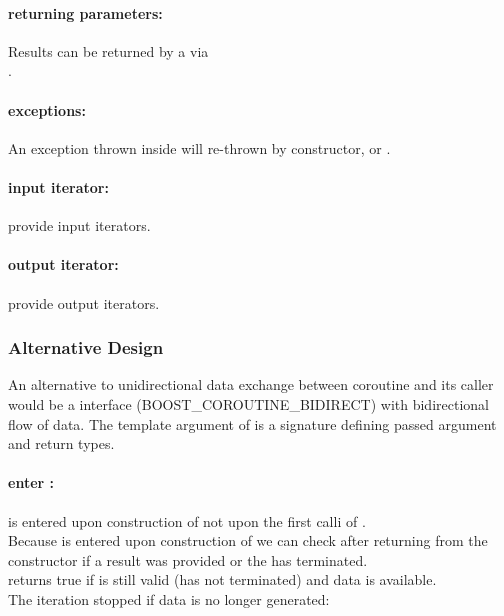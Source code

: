 \paragraph*{returning parameters:}
Results can be returned by a \corofunction via\\\pushcoroop.\\

\paragraph*{exceptions:}
An exception thrown inside \corofunction will re-thrown by \pullcoro constructor,
\pullcoroop or \pushcoroop.

\paragraph*{input iterator:}
\pullcoro provide input iterators.

\paragraph*{output iterator:}
\pushcoro provide output iterators.


\subsubsection*{Alternative Design}
An alternative to unidirectional data exchange between coroutine and its caller
would be a interface (BOOST_COROUTINE_BIDIRECT) with bidirectional flow of data.
The template argument of \coro is a signature defining passed argument and
return types.

\paragraph*{enter \corofunction:}
\corofunction is entered upon construction of \coro not upon the first calli of
\coroop.\\
\newline
Because \corofunction is entered upon construction of \coro we can check after
returning from the constructor if a result was provided or the \corofunction
has terminated.\\
\corobool returns true if \coro is still valid (\corofunction has not terminated)
and data is available.\\
The iteration stopped if data is no longer generated:

